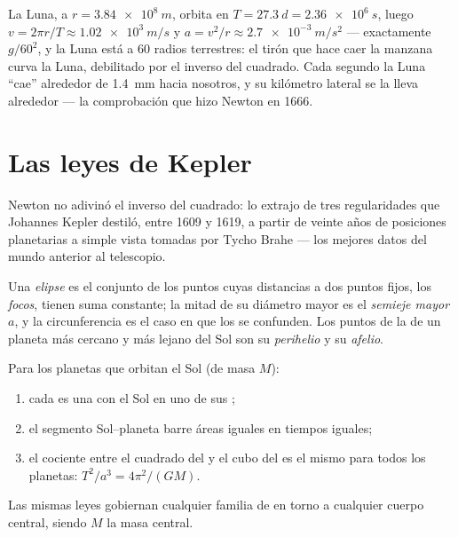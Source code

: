 \begin{example}\label{ex:g12:satellites-kepler:moon}
La Luna, a $r = \qty{3.84e8}{m}$, orbita en $T = \qty{27.3}{d} = \qty{2.36e6}{s}$,
luego $v = 2\pi r/T \approx \qty{1.02e3}{m/s}$ y
$a = v^2/r \approx \qty{2.7e-3}{m/s^2}$ --- exactamente $g/60^2$, y la Luna está a
$60$ radios terrestres: el tirón que hace caer la manzana curva la Luna, debilitado
por el inverso del cuadrado. Cada segundo la Luna ``cae'' alrededor de \qty{1.4}{mm}
hacia nosotros, y su kilómetro lateral se la lleva alrededor --- la comprobación que
hizo Newton en 1666.
\end{example}

\section{Las leyes de Kepler}

Newton no adivinó el inverso del cuadrado: lo extrajo de tres regularidades que
Johannes Kepler destiló, entre 1609 y 1619, a partir de veinte años de posiciones
planetarias a simple vista tomadas por Tycho Brahe --- los mejores datos del mundo
anterior al telescopio.

\begin{definition}[Elipse]\label{def:g12:satellites-kepler:ellipse}
Una \emph{elipse} es el conjunto de los puntos cuyas distancias a dos
puntos fijos, los \emph{focos}, tienen suma constante; la
mitad de su diámetro mayor es el \emph{semieje mayor} $a$, y la
circunferencia es el caso en que los  se confunden. Los puntos de la  de un
planeta más cercano y más lejano del Sol son su \emph{perihelio} y su
\emph{afelio}.
\end{definition}

\begin{theorem}\label{thm:g12:satellites-kepler:kepler}
%
Para los planetas que orbitan el Sol (de masa $M$):
\begin{enumerate}
  \item cada  es una  con el Sol en uno de sus ;
  \item el segmento Sol--planeta barre áreas iguales en tiempos iguales;
  \item el cociente entre el cuadrado del  y el cubo del  es el
        mismo para todos los planetas: $T^2/a^3 = 4\pi^2/(G M)$.
\end{enumerate}
Las mismas leyes gobiernan cualquier familia de  en torno a cualquier cuerpo
central, siendo $M$ la masa central. \admitted
\end{theorem}

